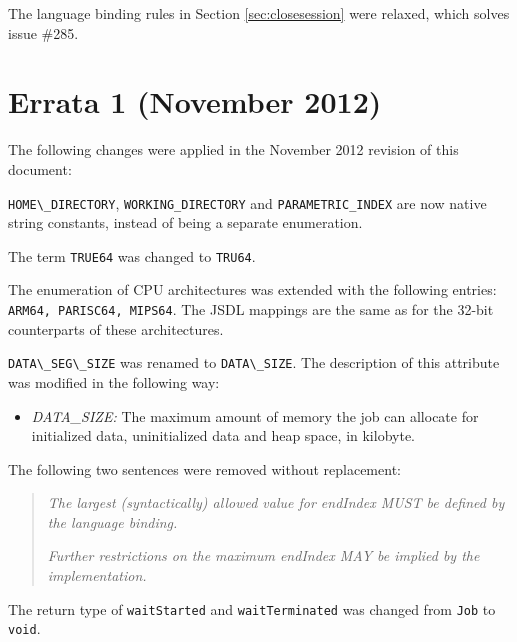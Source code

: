 \documentclass{article}
\newcommand{\h}[1]{\lstinline|#1|}
\begin{document}
The language binding rules in Section \ref{sec:closesession} were relaxed, which solves issue \#285.

\section{Errata 1 (November 2012)}

The following changes were applied in the November 2012 revision of this document:

\h{HOME\_DIRECTORY}, \h{WORKING_DIRECTORY} and \h{PARAMETRIC_INDEX} are now native string constants, instead of being a separate enumeration.

The term \h{TRUE64} was changed to \h{TRU64}.

The enumeration of CPU architectures was extended with the following entries: \h{ARM64, PARISC64, MIPS64}. The JSDL mappings are the same as for the 32-bit counterparts of these architectures.

\h{DATA\_SEG\_SIZE} was renamed to \h{DATA\_SIZE}. The description of this attribute was modified in the following way:

\begin{itemize}
\item \emph{DATA\_SIZE:} The maximum amount of memory the job can allocate for initialized data, uninitialized data and heap space, in kilobyte.
\end{itemize}

The following two sentences were removed without replacement:

\begin{quote}
\emph{The largest (syntactically) allowed value for endIndex MUST be defined by the language binding.}

\emph{Further restrictions on the maximum endIndex MAY be implied by the implementation.}
\end{quote}

The return type of \h{waitStarted} and \h{waitTerminated} was changed from \h{Job} to \h{void}.
\end{document}
